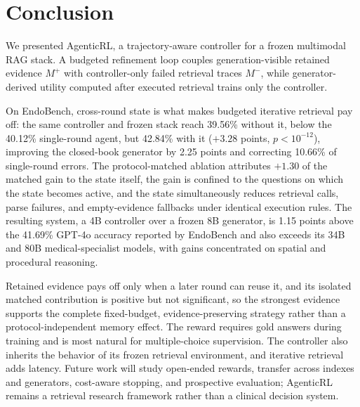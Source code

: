 \section{Conclusion}
\label{sec:conclusion}

We presented AgenticRL, a trajectory-aware controller for a frozen multimodal
RAG stack. A budgeted refinement loop couples generation-visible retained
evidence $M^+$ with controller-only failed retrieval traces $M^-$, while
generator-derived utility computed after executed retrieval trains only the
controller.

On EndoBench, cross-round state is what makes budgeted iterative retrieval pay
off: the same controller and frozen stack reach 39.56\% without it, below the
40.12\% single-round agent, but 42.84\% with it ($+3.28$ points,
$p<10^{-12}$), improving the closed-book generator by 2.25 points and correcting
10.66\% of single-round errors. The protocol-matched ablation attributes
$+1.30$ of the matched gain to the state itself, the gain is confined to the
questions on which the state becomes active, and the state simultaneously
reduces retrieval calls, parse failures, and empty-evidence fallbacks under
identical execution rules. The resulting system, a 4B controller over a frozen
8B generator, is 1.15 points above the 41.69\% GPT-4o accuracy reported by
EndoBench and also exceeds its 34B and 80B medical-specialist models, with
gains concentrated on spatial and procedural reasoning.

Retained evidence pays off only when a later round can reuse it, and its
isolated matched contribution is positive but not significant, so the strongest
evidence supports the complete fixed-budget, evidence-preserving strategy rather
than a protocol-independent memory effect. The reward requires gold answers
during training and is most natural for multiple-choice supervision. The
controller also inherits the behavior of its frozen retrieval environment, and
iterative retrieval adds latency. Future work will study open-ended rewards,
transfer across indexes and generators, cost-aware stopping, and prospective
evaluation; AgenticRL remains a retrieval research framework rather than a
clinical decision system.
